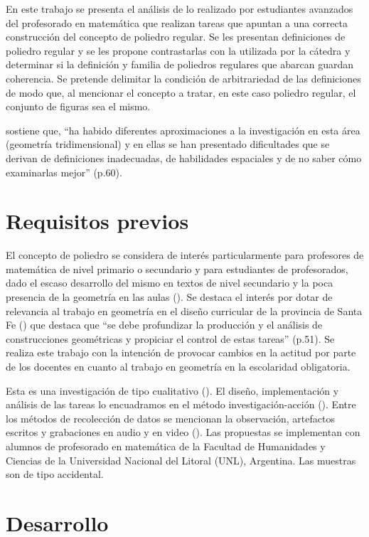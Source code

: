 \documentclass[oneside,spanish]{amsart}
\numberwithin{equation}{section}
\theoremstyle{definition}
\begin{document}
En este trabajo se presenta el análisis de lo realizado por estudiantes avanzados del profesorado en matemática que realizan tareas que apuntan a una correcta construcción del concepto de poliedro regular. Se les presentan definiciones de poliedro regular y se les propone contrastarlas con la utilizada por la cátedra y determinar si la definición y familia de poliedros regulares que abarcan guardan coherencia. Se pretende delimitar la condición de arbitrariedad de las definiciones de modo que, al mencionar el concepto a tratar, en este caso poliedro regular, el conjunto de figuras sea el mismo.

\citet{guillen97} sostiene que, “ha habido diferentes aproximaciones a la investigación en esta área (geometría tridimensional) y en ellas se han presentado dificultades que se derivan de definiciones inadecuadas, de habilidades espaciales y de no saber cómo examinarlas mejor” (p.60).

\section{Requisitos previos}

El concepto de poliedro se considera de interés particularmente para profesores de matemática de nivel primario o secundario y para estudiantes de profesorados, dado el escaso desarrollo del mismo en textos de nivel secundario y la poca presencia de la geometría en las aulas (\citet{mantica19}).  Se destaca el interés por dotar de relevancia al trabajo en geometría en el diseño curricular de la provincia de Santa Fe (\cite{santafe14}) que destaca que “se debe profundizar la producción y el análisis de construcciones geométricas y propiciar el control de estas tareas” (p.51). Se realiza este trabajo con la intención de provocar cambios en la actitud por parte de los docentes en cuanto al trabajo en geometría en la escolaridad obligatoria.

Esta es una investigación de tipo cualitativo (\citet{mcknight00}). El diseño, implementación y análisis de las tareas lo encuadramos en el método investigación-acción (\citet{elliot90}). Entre los métodos de recolección de datos se mencionan la observación, artefactos escritos y grabaciones en audio y en video (\citet{mcknight00}). Las propuestas se implementan con alumnos de profesorado en matemática de la Facultad de Humanidades y Ciencias de la Universidad Nacional del Litoral (UNL), Argentina. Las muestras son de tipo accidental.

\section{Desarrollo}
\end{document}
